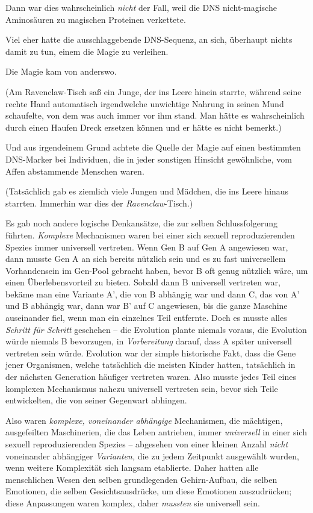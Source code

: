 {Dann war dies wahrscheinlich \emph{nicht} der Fall, weil die DNS nicht-magische Aminosäuren zu magischen Proteinen verkettete.

Viel eher hatte die ausschlaggebende DNS-Sequenz, an sich, überhaupt nichts damit zu tun, einem die Magie zu verleihen.

Die Magie kam von anderswo.

(Am Ravenclaw-Tisch saß ein Junge, der ins Leere hinein starrte, während seine rechte Hand automatisch irgendwelche unwichtige Nahrung in seinen Mund schaufelte, von dem was auch immer vor ihm stand. Man hätte es wahrscheinlich durch einen Haufen Dreck ersetzen können und er hätte es nicht bemerkt.)

Und aus irgendeinem Grund achtete die Quelle der Magie auf einen bestimmten DNS-Marker bei Individuen, die in jeder sonstigen Hinsicht gewöhnliche, vom Affen abstammende Menschen waren.

(Tatsächlich gab es ziemlich viele Jungen und Mädchen, die ins Leere hinaus starrten. Immerhin war dies der \emph{Ravenclaw}-Tisch.)

Es gab noch andere logische Denkansätze, die zur selben Schlussfolgerung führten. \emph{Komplexe} Mechanismen waren bei einer sich sexuell reproduzierenden Spezies immer universell vertreten. Wenn Gen B auf Gen A angewiesen war, dann musste Gen A an sich bereits nützlich sein und es zu fast universellem Vorhandensein im Gen-Pool gebracht haben, bevor B oft genug nützlich wäre, um einen Überlebensvorteil zu bieten. Sobald dann B universell vertreten war, bekäme man eine Variante A', die von B abhängig war und dann C, das von A' und B abhängig war, dann war B' auf C angewiesen, bis die ganze Maschine auseinander fiel, wenn man ein einzelnes Teil entfernte. Doch es musste alles \emph{Schritt für Schritt} geschehen -- die Evolution plante niemals voraus, die Evolution würde niemals B bevorzugen, in \emph{Vorbereitung} darauf, dass A später universell vertreten sein würde. Evolution war der simple historische Fakt, dass die Gene jener Organismen, welche tatsächlich die meisten Kinder hatten, tatsächlich in der nächsten Generation häufiger vertreten waren. Also musste jedes Teil eines komplexen Mechanismus nahezu universell vertreten sein, bevor sich Teile entwickelten, die von seiner Gegenwart abhingen.

Also waren \emph{komplexe, voneinander abhängige} Mechanismen, die mächtigen, ausgefeilten Maschinerien, die das Leben antrieben, immer \emph{universell} in einer sich sexuell reproduzierenden Spezies -- abgesehen von einer kleinen Anzahl \emph{nicht} voneinander abhängiger \emph{Varianten,} die zu jedem Zeitpunkt ausgewählt wurden, wenn weitere Komplexität sich langsam etablierte. Daher hatten alle menschlichen Wesen den selben grundlegenden Gehirn-Aufbau, die selben Emotionen, die selben Gesichtsausdrücke, um diese Emotionen auszudrücken; diese Anpassungen waren komplex, daher \emph{mussten} sie universell sein.

}
